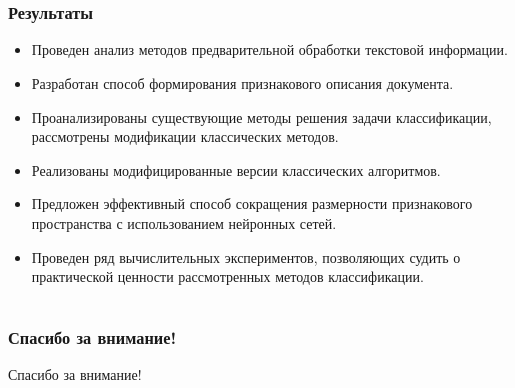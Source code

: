 \documentclass{beamer}
\begin{document}
\section{}
\begin{frame}
\frametitle{Результаты}
\begin{itemize}
	\item{Проведен анализ методов предварительной обработки текстовой информации.}
	\item{Разработан способ формирования признакового описания документа.}
	\item{Проанализированы существующие методы решения задачи классификации, рассмотрены модификации классических методов.}
	\item{Реализованы модифицированные версии классических алгоритмов.}
	\item{Предложен эффективный способ сокращения размерности признакового пространства с использованием нейронных сетей.}
	\item{Проведен ряд вычислительных экспериментов, позволяющих судить о практической ценности рассмотренных методов классификации.}
\end{itemize}
\end{frame}



\section{}
\begin{frame}
\frametitle{Спасибо за внимание!}
	\begin{center}
		Спасибо за внимание!
	\end{center}
\end{frame}
\end{document}

